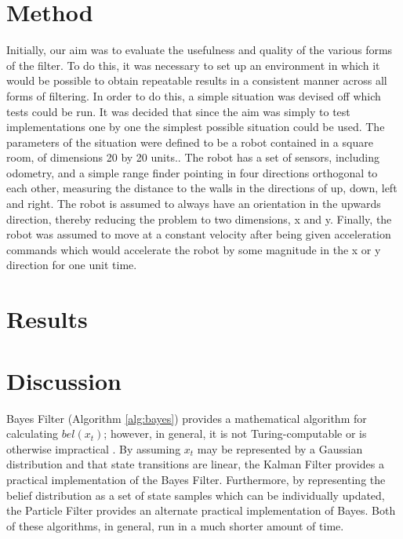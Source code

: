 \documentclass[english]{article}
\begin{document}
\section{Method}
Initially, our aim was to evaluate the usefulness and quality of the various forms of the filter. To do this, it was necessary to set up an environment in which it would be possible to obtain repeatable results in a consistent manner across all forms of filtering.
In order to do this, a simple situation was devised off which tests could be run. It was decided that since the aim was simply to test implementations one by one the simplest possible situation could be used. The parameters of the situation were defined to be a robot contained in a square room, of dimensions 20 by 20 units.. The robot has a set of sensors, including odometry, and a simple range finder pointing in four directions orthogonal to each other, measuring the distance to the walls in the directions of up, down, left and right. 
The robot is assumed to always have an orientation in the upwards direction, thereby reducing the problem to two dimensions, x and y. Finally, the robot was assumed to move at a constant velocity after being given acceleration commands which would accelerate the robot by some magnitude in the x or y direction for one unit time.

\section{Results}

\section{Discussion}

Bayes Filter (Algorithm \ref{alg:bayes}) provides a mathematical algorithm for calculating $bel(x_t)$; however, in general, it is not Turing-computable or is otherwise impractical \cite{probrob}. By assuming $x_t$ may be represented by a Gaussian distribution and that state transitions are linear, the Kalman Filter provides a practical implementation of the Bayes Filter. Furthermore, by representing the belief distribution as a set of state samples which can be individually updated, the Particle Filter provides an alternate practical implementation of Bayes. Both of these algorithms, in general, run in a much shorter amount of time.
\end{document}
